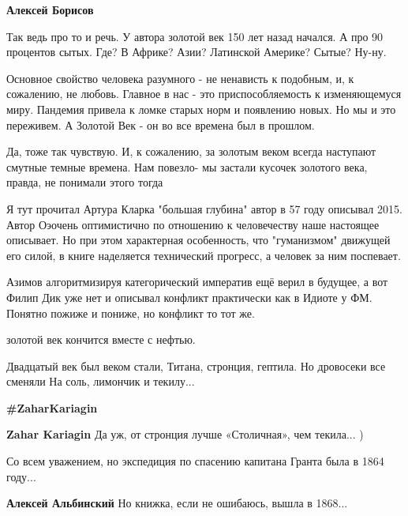 \begin{itemize}
\begin{itemize}
\textbf{Алексей Борисов} 

Так ведь про то и речь. У автора золотой век 150 лет назад начался. А про 90
процентов сытых. Где? В Африке? Азии? Латинской Америке? Сытые? Ну-ну.

\end{itemize} %

Основное свойство человека разумного - не ненависть к подобным, и, к сожалению,
не любовь. Главное в нас - это приспособляемость к изменяющемуся миру. Пандемия
привела к ломке старых норм и появлению новых. Но мы и это переживем. А Золотой
Век - он во все времена был в прошлом.


Да, тоже так чувствую. И, к сожалению, за золотым веком всегда наступают
смутные темные времена. Нам повезло- мы застали кусочек золотого века, правда,
не понимали этого тогда


Я тут прочитал Артура Кларка "большая глубина" автор в 57 году описывал 2015.
Автор Оэочень оптимистично по отношению к человечеству наше настоящее
описывает. Но при этом характерная особенность, что "гуманизмом" движущей его
силой, в книге наделяется технический прогресс, а человек за ним поспевает.

Азимов алгоритмизируя категорический императив ещё верил в будущее, а вот Филип
Дик уже нет и описывал конфликт практически как в Идиоте у ФМ. Понятно пожиже и
пониже, но конфликт то тот же.

золотой век кончится вместе с нефтью.


\obeycr
Двадцатый век был веком стали,
Титана, стронция, гептила.
Но дровосеки все сменяли
На соль, лимончик и текилу...
\restorecr

\textbf{\#ZaharKariagin}

\begin{itemize} %
\textbf{Zahar Kariagin} Да уж, от стронция лучше «Столичная», чем текила... )
\end{itemize} %


Со всем уважением, но экспедиция по спасению капитана Гранта была в 1864
году...

\begin{itemize} %
\textbf{Алексей Альбинский} Но книжка, если не ошибаюсь, вышла в 1868...


\end{itemize}
\end{itemize}

